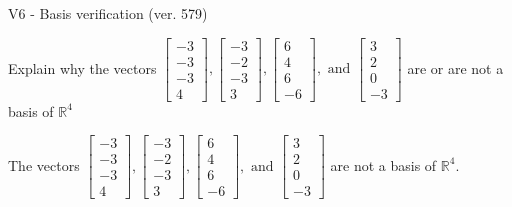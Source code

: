 \begin{exercise}
  \begin{exerciseTitle}V6 - Basis verification (ver. 579)\end{exerciseTitle}
  \begin{exerciseStatement}
    Explain why the vectors \(\left[\begin{array}{r}
-3 \\
-3 \\
-3 \\
4
\end{array}\right] , \left[\begin{array}{r}
-3 \\
-2 \\
-3 \\
3
\end{array}\right] , \left[\begin{array}{r}
6 \\
4 \\
6 \\
-6
\end{array}\right] , \text{ and } \left[\begin{array}{r}
3 \\
2 \\
0 \\
-3
\end{array}\right]\) are or are not a basis of \(\mathbb{R}^4\)	


  \end{exerciseStatement}
  \begin{exerciseAnswer}
   The vectors \(\left[\begin{array}{r}
-3 \\
-3 \\
-3 \\
4
\end{array}\right] , \left[\begin{array}{r}
-3 \\
-2 \\
-3 \\
3
\end{array}\right] , \left[\begin{array}{r}
6 \\
4 \\
6 \\
-6
\end{array}\right] , \text{ and } \left[\begin{array}{r}
3 \\
2 \\
0 \\
-3
\end{array}\right]\) 
  	 are not  a basis of \(\mathbb{R}^4\).
  


  \end{exerciseAnswer}
\end{exercise}